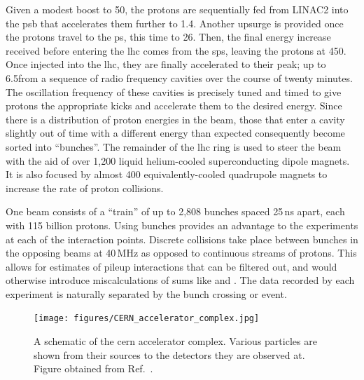 Given a modest boost to 50\MeV, the protons are sequentially fed from LINAC2 into the \acrfull{psb} that accelerates them further to 1.4\GeV. Another upsurge is provided once the protons travel to the \acrfull{ps}, this time to 26\GeV. Then, the final energy increase received before entering the \acrshort{lhc} comes from the \acrfull{sps}, leaving the protons at 450\GeV. Once injected into the \acrshort{lhc}, they are finally accelerated to their peak; up to 6.5\TeV from a sequence of radio frequency cavities over the course of twenty minutes. The oscillation frequency of these cavities is precisely tuned and timed to give protons the appropriate kicks and accelerate them to the desired energy. Since there is a distribution of proton energies in the beam, those that enter a cavity slightly out of time with a different energy than expected consequently become sorted into ``bunches''. The remainder of the \acrshort{lhc} ring is used to steer the beam with the aid of over 1,200 liquid helium-cooled superconducting dipole magnets. It is also focused by almost 400 equivalently-cooled quadrupole magnets to increase the rate of proton collisions.

One beam consists of a ``train'' of up to 2,808 bunches spaced 25\,ns apart, each with 115 billion protons. Using bunches provides an advantage to the experiments at each of the interaction points. Discrete collisions take place between bunches in the opposing beams at 40\,MHz as opposed to continuous streams of protons. This allows for estimates of \gls{pileup} interactions that can be filtered out, and would otherwise introduce miscalculations of sums like \ptmiss and \HT. The data recorded by each experiment is naturally separated by the bunch crossing or event.

\begin{figure}[htbp]
    \centering
    \texttt{[image: figures/CERN\_accelerator\_complex.jpg]}
    \caption[A schematic of the \acrshort{cern} accelerator complex]{A schematic of the \acrshort{cern} accelerator complex. Various particles are shown from their sources to the detectors they are observed at. Figure obtained from Ref.~.}
    \label{fig:cern_accelerator_complex}
\end{figure}





